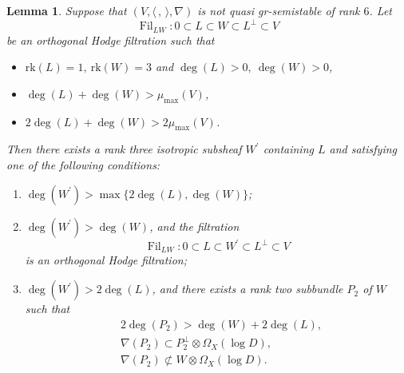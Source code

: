 \documentclass[JEP,XML,SOM,Unicode,published]{cedram}
\newcommand{\grsemistable}{gr\nobreakdash-semi\-stable\xspace}
\DeclareMathOperator{\Filt}{Fil}
\newcommand{\rk}{\mathrm{rk}}
\theoremstyle{plain}
\newtheorem{lem}[thm]{Lemma}
\theoremstyle{definition}
\begin{document}
\begin{lem}\label{degreeincreasing}
Suppose that $(V,\langle \,, \, \rangle,\nabla)$ is not quasi \grsemistable of rank $6$. Let
\[
\Filt_{LW}:0\subset L\subset W\subset L^\perp\subset V
\]
be an orthogonal Hodge filtration such that
\begin{itemize}
\item $\rk(L)=1, \ \rk(W)=3$ and $\deg(L)>0, \ \deg(W)>0$,
\item $\deg(L)+\deg(W)>\mu_{\max}(V)$,
\item $2\deg(L)+\deg(W)>2\mu_{\max}(V)$.
\end{itemize}
Then there exists a rank three isotropic subsheaf $W^\prime$ containing $L$ and satisfying one of the following conditions:
\begin{enumerate}
\item $\deg(W^\prime)>\max\{2\deg(L),\deg(W)\}$;
\item $\deg(W^\prime)>\deg(W)$, and the filtration
\[
\Filt_{LW}:0\subset L\subset W^\prime\subset L^\perp\subset V
\]
is an orthogonal Hodge filtration;
\item $\deg(W^\prime)>2\deg(L)$, and there exists a rank two subbundle $P_2$ of $W$ such that
\begin{align*}
& 2\deg(P_2)>\deg(W)+2\deg(L), \\
& \nabla(P_2)\subset P_2^\perp\otimes\Omega_X(\log D), \\ & \nabla(P_2)\not\subset W\otimes\Omega_X(\log D).
\end{align*}
\end{enumerate}
\end{lem}
\end{document}
